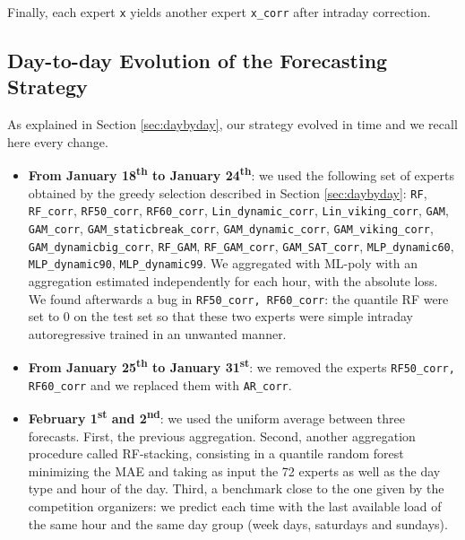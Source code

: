 \documentclass[transmag]{IEEEtran}
\begin{document}
Finally, each expert \texttt{x} yields another expert \texttt{x\_corr} after intraday correction.

\subsection{Day-to-day Evolution of the Forecasting Strategy}
As explained in Section \ref{sec:daybyday}, our strategy evolved in time and we recall here every change.
\begin{itemize}
\item
\textbf{From January 18\textsuperscript{th} to January 24\textsuperscript{th}}: we used the following set of experts obtained by the greedy selection described in Section \ref{sec:daybyday}: \texttt{RF}, \texttt{RF\_corr}, \texttt{RF50\_corr}, \texttt{RF60\_corr},  \texttt{Lin\_dynamic\_corr}, \texttt{Lin\_viking\_corr}, \texttt{GAM}, \texttt{GAM\_corr}, \texttt{GAM\_staticbreak\_corr}, \texttt{GAM\_dynamic\_corr}, \texttt{GAM\_viking\_corr}, \texttt{GAM\_dynamicbig\_corr}, \texttt{RF\_GAM}, \texttt{RF\_GAM\_corr}, \texttt{GAM\_SAT\_corr}, \texttt{MLP\_dynamic60}, \texttt{MLP\_dynamic90}, \texttt{MLP\_dynamic99}. We aggregated with ML-poly with an aggregation estimated independently for each hour, with the absolute loss. We found afterwards a bug in \texttt{RF50\_corr, RF60\_corr}: the quantile RF were set to 0 on the test set so that these two experts were simple intraday autoregressive trained in an unwanted manner.

\item
\textbf{From January 25\textsuperscript{th} to January 31\textsuperscript{st}}: we removed the experts \texttt{RF50\_corr, RF60\_corr} and we replaced them with \texttt{AR\_corr}.


\item
\textbf{February 1\textsuperscript{st} and 2\textsuperscript{nd}}:
we used the uniform average between three forecasts. First, the previous aggregation. Second, another aggregation procedure called RF-stacking, consisting in a quantile random forest minimizing the MAE and taking as input the 72 experts as well as the day type and hour of the day. Third, a benchmark close to the one given by the competition organizers: we predict each time with the last available load of the same hour and the same day group (week days, saturdays and sundays).


\end{itemize}
\end{document}
